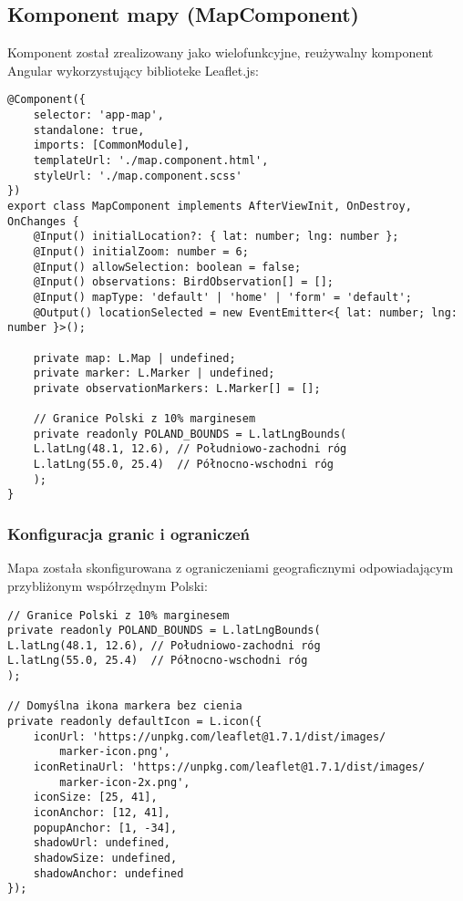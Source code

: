 \subsection{Komponent mapy (MapComponent)}
Komponent został zrealizowany jako wielofunkcyjne, reużywalny komponent Angular wykorzystujący biblioteke Leaflet.js:

\begin{lstlisting}[style=tsstyle, caption={Komponent mapy w Angular}]
@Component({
	selector: 'app-map',
	standalone: true,
	imports: [CommonModule],
	templateUrl: './map.component.html',
	styleUrl: './map.component.scss'
})
export class MapComponent implements AfterViewInit, OnDestroy, OnChanges {
	@Input() initialLocation?: { lat: number; lng: number };
	@Input() initialZoom: number = 6;
	@Input() allowSelection: boolean = false;
	@Input() observations: BirdObservation[] = [];
	@Input() mapType: 'default' | 'home' | 'form' = 'default';
	@Output() locationSelected = new EventEmitter<{ lat: number; lng: number }>();
	
	private map: L.Map | undefined;
	private marker: L.Marker | undefined;
	private observationMarkers: L.Marker[] = [];
	
	// Granice Polski z 10% marginesem
	private readonly POLAND_BOUNDS = L.latLngBounds(
	L.latLng(48.1, 12.6), // Południowo-zachodni róg
	L.latLng(55.0, 25.4)  // Północno-wschodni róg
	);
}
\end{lstlisting}

\subsubsection{Konfiguracja granic i ograniczeń}
Mapa została skonfigurowana z ograniczeniami geograficznymi odpowiadającym przybliżonym współrzędnym Polski:

\begin{lstlisting}[style=tsstyle, caption={Parametry mapy}]
// Granice Polski z 10% marginesem
private readonly POLAND_BOUNDS = L.latLngBounds(
L.latLng(48.1, 12.6), // Południowo-zachodni róg
L.latLng(55.0, 25.4)  // Północno-wschodni róg
);

// Domyślna ikona markera bez cienia
private readonly defaultIcon = L.icon({
	iconUrl: 'https://unpkg.com/leaflet@1.7.1/dist/images/
		marker-icon.png',
	iconRetinaUrl: 'https://unpkg.com/leaflet@1.7.1/dist/images/
		marker-icon-2x.png',
	iconSize: [25, 41],
	iconAnchor: [12, 41],
	popupAnchor: [1, -34],
	shadowUrl: undefined,
	shadowSize: undefined,
	shadowAnchor: undefined
});
\end{lstlisting}

